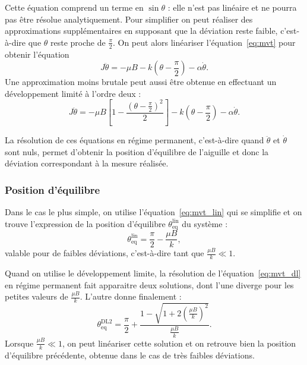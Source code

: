 \documentclass[12pt,a4paper,fleqn]{article}
\newcommand{\cad}{c'est-à-dire}
\begin{document}
Cette équation comprend un terme en $\sin\theta$ : elle n'est pas linéaire et ne pourra pas être résolue analytiquement.
Pour simplifier on peut réaliser des approximations supplémentaires en supposant que la déviation reste faible, \cad{} que $\theta$ reste \og proche \fg{} de $\tfrac{\pi}{2}$.
On peut alors linéariser l'équation~\ref{eq:mvt} pour obtenir l'équation
\begin{equation}
    J\ddot{\theta} = -\mu B - k\left(\theta-\frac{\pi}{2}\right) - \alpha\dot{\theta}.
    \label{eq:mvt_lin}
\end{equation}
Une approximation moins brutale peut aussi être obtenue en effectuant un développement limité à l'ordre deux :
\begin{equation}
    J\ddot{\theta} = - \mu B \left[ 1-\frac{\left(\theta-\frac{\pi}{2}\right)^2}{2} \right] - k\left(\theta-\frac{\pi}{2}\right) - \alpha\dot{\theta}.
    \label{eq:mvt_dl}
\end{equation}

La résolution de ces équations en régime permanent, \cad{} quand $\ddot{\theta}$ et $\dot{\theta}$ sont nuls, permet d'obtenir la position d'équilibre de l'aiguille et donc la déviation correspondant à la mesure réalisée.

\subsubsection{Position d'équilibre}

Dans le cas le plus simple, on utilise l'équation~\ref{eq:mvt_lin} qui se simplifie et on trouve l'expression de la position d'équilibre $\theta_\mathrm{eq}^\mathrm{lin}$ du système :
\begin{equation}
    \theta_\mathrm{eq}^\mathrm{lin} = \frac{\pi}{2} - \frac{\mu B}{k},
    \label{eq:sol_lin}
\end{equation}
valable pour de faibles déviations, \cad{} tant que $\frac{\mu B}{k} \ll 1$.

Quand on utilise le développement limite, la résolution de l'équation~\ref{eq:mvt_dl} en régime permanent fait apparaitre deux solutions, dont l'une diverge pour les petites valeurs de $\tfrac{\mu B}{k}$.
L'autre donne finalement :
\begin{equation}
    \theta_\mathrm{eq}^\mathrm{DL2} = \frac{\pi}{2} + \frac{1-\sqrt{1+2\left(\frac{\mu B}{k}\right)^2}}{\frac{\mu B}{k}}.
    \label{eq:sol_dl}
\end{equation}
Lorsque $\frac{\mu B}{k} \ll 1$, on peut linéariser cette solution et on retrouve bien la position d'équilibre précédente, obtenue dans le cas de très faibles déviations.
\end{document}
